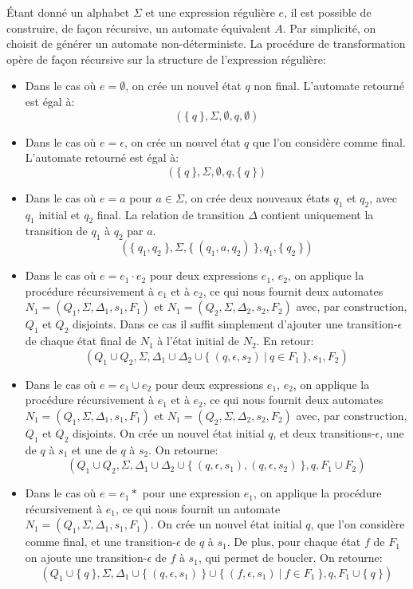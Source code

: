 Étant donné un alphabet $\Sigma$ et une expression régulière $e$, il est possible de construire, de façon récursive, un automate équivalent $A$.
Par simplicité, on choisit de générer un automate non-déterministe.
La procédure de transformation opère de façon récursive sur la structure de l'expression régulière:
\begin{itemize}
\item Dans le cas où $e = \emptyset$, on crée un nouvel état $q$ non final. L'automate retourné est égal à:
\[
(\{\ q\ \}, \Sigma, \emptyset, q, \emptyset)
\] 
\item Dans le cas où $e = \epsilon$, on crée un nouvel état $q$ que l'on considère comme final. L'automate retourné est égal à:
\[
(\{\ q\ \}, \Sigma, \emptyset, q, \{\ q\ \})
\]
\item Dans le cas où $e = a$ pour $a \in \Sigma$, on crée deux nouveaux états $q_1$ et $q_2$, avec $q_1$ initial et $q_2$ final.
La relation de transition $\Delta$ contient uniquement la transition de $q_1$ à $q_2$ par $a$.
\[
(\{\ q_1, q_2\ \}, \Sigma, \{\ (q_1, a, q_2)\ \}, q_1, \{\ q_2\ \})
\]
\item Dans le cas où $e = e_1 \cdot e_2$ pour deux expressions $e_1$, $e_2$, on applique la procédure récursivement à $e_1$ et à $e_2$, ce qui nous fournit deux automates $N_1 = (Q_1, \Sigma, \Delta_1, s_1, F_1)$ et $N_1 = (Q_2, \Sigma, \Delta_2, s_2, F_2)$ avec, par construction, $Q_1$ et $Q_2$ disjoints. Dans ce cas il suffit simplement d'ajouter une transition-$\epsilon$ de chaque état final de $N_1$ à l'état initial de $N_2$. En retour:
\[
(Q_1 \cup Q_2, \Sigma, \Delta_1 \cup \Delta_2 \cup \{\ (q, \epsilon, s_2)\ |\ q \in F_1\ \}, s_1, F_2)
\]
\item Dans le cas où $e = e_1 \cup e_2$ pour deux expressions $e_1$, $e_2$, on applique la procédure récursivement à $e_1$ et à $e_2$, ce qui nous fournit deux automates $N_1 = (Q_1, \Sigma, \Delta_1, s_1, F_1)$ et $N_1 = (Q_2, \Sigma, \Delta_2, s_2, F_2)$ avec, par construction, $Q_1$ et $Q_2$ disjoints.
On crée un nouvel état initial $q$, et deux transitions-$\epsilon$, une de $q$ à $s_1$ et une de $q$ à $s_2$. On retourne:
\[
(Q_1 \cup Q_2, \Sigma, \Delta_1 \cup \Delta_2 \cup \{\ (q, \epsilon, s_1), (q, \epsilon, s_2)\ \}, q, F_1 \cup F_2)
\]
\item Dans le cas où $e = e_1*$ pour une expression $e_1$, on applique la procédure récursivement à $e_1$, ce qui nous fournit un automate $N_1 = (Q_1, \Sigma, \Delta_1, s_1, F_1)$.
On crée un nouvel état initial $q$, que l'on considère comme final, et une transition-$\epsilon$ de $q$ à $s_1$. De plus, pour chaque état $f$ de $F_1$ on ajoute une transition-$\epsilon$ de $f$ à $s_1$, qui permet de boucler. On retourne:
\[
(Q_1 \cup \{\ q\ \}, \Sigma, \Delta_1 \cup \{\ (q, \epsilon, s_1)\ \} \cup \{\ (f, \epsilon, s_1)\ |\ f \in F_1\ \}, q, F_1 \cup \{\ q\ \})
\]
\end{itemize}

